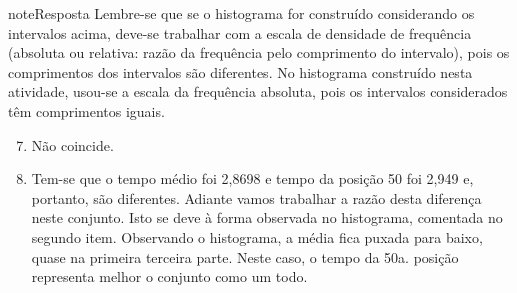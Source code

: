 \begin{sphinxadmonition}{note}{Resposta}
Lembre-se que se o histograma for construído considerando os intervalos acima, deve-se trabalhar com a escala de densidade de frequência (absoluta ou relativa: razão da frequência pelo comprimento do intervalo), pois os comprimentos dos intervalos são diferentes. No histograma construído nesta atividade, usou-se a escala da frequência absoluta, pois os intervalos considerados têm comprimentos iguais.
\begin{enumerate}
\setcounter{enumi}{6}
\item {} 
Não coincide.

\item {} 
Tem-se que o tempo médio foi 2,8698 e tempo da posição 50 foi 2,949 e, portanto, são diferentes. Adiante vamos trabalhar a razão desta diferença neste conjunto. Isto se deve à forma observada no histograma, comentada no segundo item. Observando o histograma, a média fica puxada para baixo, quase na primeira terceira parte. Neste caso, o tempo da 50a. posição representa melhor o conjunto como um todo.

\end{enumerate}
\end{sphinxadmonition}


